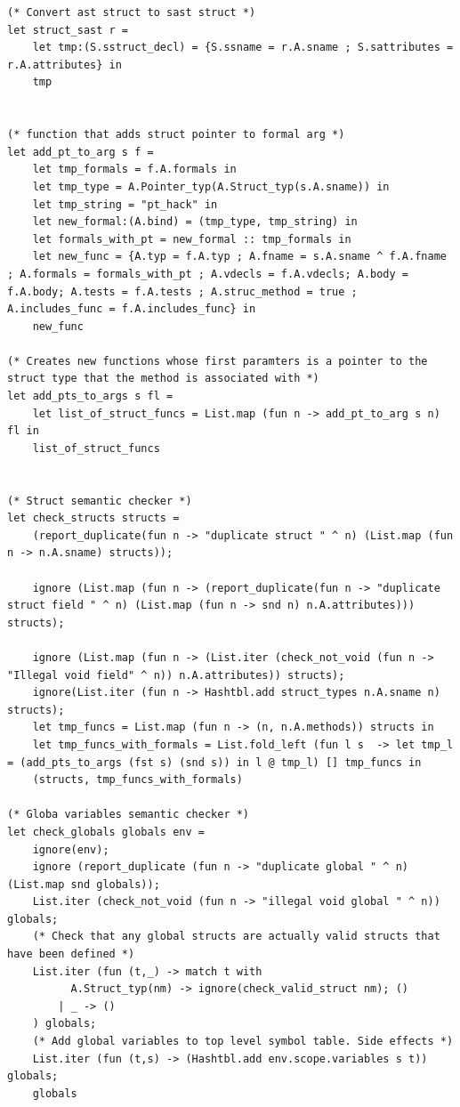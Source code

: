 \documentclass{article}
\begin{document}
\begin{lstlisting}
(* Convert ast struct to sast struct *)
let struct_sast r = 
	let tmp:(S.sstruct_decl) = {S.ssname = r.A.sname ; S.sattributes = r.A.attributes} in
	tmp


(* function that adds struct pointer to formal arg *)
let add_pt_to_arg s f =
	let tmp_formals = f.A.formals in
	let tmp_type = A.Pointer_typ(A.Struct_typ(s.A.sname)) in 
	let tmp_string = "pt_hack" in
	let new_formal:(A.bind) = (tmp_type, tmp_string) in
	let formals_with_pt = new_formal :: tmp_formals in
	let new_func = {A.typ = f.A.typ ; A.fname = s.A.sname ^ f.A.fname ; A.formals = formals_with_pt ; A.vdecls = f.A.vdecls; A.body = f.A.body; A.tests = f.A.tests ; A.struc_method = true ; A.includes_func = f.A.includes_func} in 
	new_func

(* Creates new functions whose first paramters is a pointer to the struct type that the method is associated with *)
let add_pts_to_args s fl = 
	let list_of_struct_funcs = List.map (fun n -> add_pt_to_arg s n) fl in	
	list_of_struct_funcs
	

(* Struct semantic checker *)
let check_structs structs = 
	(report_duplicate(fun n -> "duplicate struct " ^ n) (List.map (fun n -> n.A.sname) structs)); 

	ignore (List.map (fun n -> (report_duplicate(fun n -> "duplicate struct field " ^ n) (List.map (fun n -> snd n) n.A.attributes))) structs);

	ignore (List.map (fun n -> (List.iter (check_not_void (fun n -> "Illegal void field" ^ n)) n.A.attributes)) structs);
	ignore(List.iter (fun n -> Hashtbl.add struct_types n.A.sname n) structs);
	let tmp_funcs = List.map (fun n -> (n, n.A.methods)) structs in
	let tmp_funcs_with_formals = List.fold_left (fun l s  -> let tmp_l = (add_pts_to_args (fst s) (snd s)) in l @ tmp_l) [] tmp_funcs in
	(structs, tmp_funcs_with_formals)

(* Globa variables semantic checker *)
let check_globals globals env = 
	ignore(env);
	ignore (report_duplicate (fun n -> "duplicate global " ^ n) (List.map snd globals)); 
	List.iter (check_not_void (fun n -> "illegal void global " ^ n)) globals;
	(* Check that any global structs are actually valid structs that have been defined *)
	List.iter (fun (t,_) -> match t with 
		  A.Struct_typ(nm) -> ignore(check_valid_struct nm); ()
		| _ -> ()
	) globals;
	(* Add global variables to top level symbol table. Side effects *)
	List.iter (fun (t,s) -> (Hashtbl.add env.scope.variables s t)) globals;
	globals


\end{lstlisting}
\end{document}
